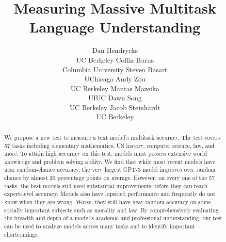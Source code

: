 \documentclass{article} %
\title{Measuring Massive Multitask\\Language Understanding}
\author{
Dan Hendrycks\\UC Berkeley \And Collin Burns\\Columbia University \And Steven Basart\\UChicago \And Andy Zou\\UC Berkeley \AND Mantas Mazeika\\UIUC \And Dawn Song\\UC Berkeley \And Jacob Steinhardt\\UC Berkeley\AND
}
\begin{document}
\maketitle

\vspace{-35pt}
\begin{abstract}
We propose a new test to measure a text model's multitask accuracy. The test covers 57 tasks including elementary mathematics, US history, computer science, law, and more. To attain high accuracy on this test, models must possess extensive world knowledge and problem solving ability. We find that while most recent models have near random-chance accuracy, the very largest GPT-3 model improves over random chance by almost 20 percentage points on average. However, on every one of the 57 tasks, the best models still need substantial improvements before they can reach expert-level accuracy. Models also have lopsided performance and frequently do not know when they are wrong. Worse, they still have near-random accuracy on some socially important subjects such as morality and law. By comprehensively evaluating the breadth and depth of a model's academic and professional understanding, our test can be used to analyze models across many tasks and to identify important shortcomings.
\end{abstract}















% 
% 

\newpage

\newpage
\appendix

\end{document}
